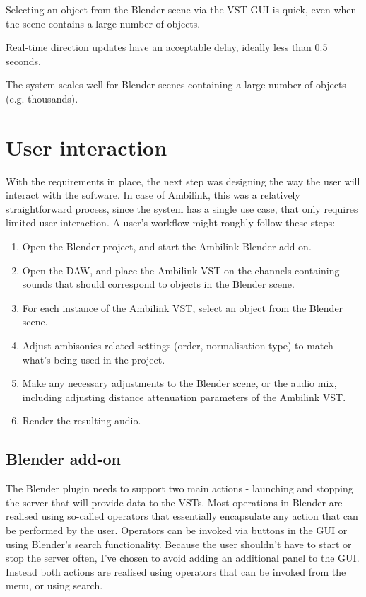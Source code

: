\begin{nonfuncreqs}
    \item Selecting an object from the Blender scene via the VST GUI is quick,
    even when the scene contains a large number of objects.
    \item Real-time direction updates have an acceptable delay, ideally less than 0.5 seconds.
    \item The system scales well for Blender scenes containing a large number of objects (e.g. thousands). 
\end{nonfuncreqs}

\section{User interaction}
With the requirements in place, the next step was designing the way the user will interact with the software.
In case of Ambilink, this was a relatively straightforward process, 
since the system has a single use case, that only requires limited user interaction.
A user's workflow might roughly follow these steps:
\begin{enumerate}
    \item Open the Blender project, and start the Ambilink Blender add-on.
    \item Open the DAW, and place the Ambilink VST on the channels containing sounds that should correspond to objects in the Blender scene.
    \item For each instance of the Ambilink VST, select an object from the Blender scene.
    \item Adjust ambisonics-related settings (order, normalisation type) to match what's being used in the project.
    \item Make any necessary adjustments to the Blender scene, or the audio mix, including adjusting distance attenuation parameters of the Ambilink VST.
    \item Render the resulting audio.
\end{enumerate}

\subsection{Blender add-on}
The Blender plugin needs to support two main actions - launching and stopping the server that will provide data to the VSTs.
Most operations in Blender are realised using so-called operators that essentially encapsulate any action that can be performed by the user.
Operators can be invoked via buttons in the GUI or using Blender's search functionality.
Because the user shouldn't have to start or stop the server often, I've chosen to avoid adding an additional panel to the GUI.
Instead both actions are realised using operators that can be invoked from the  menu, or using search.

